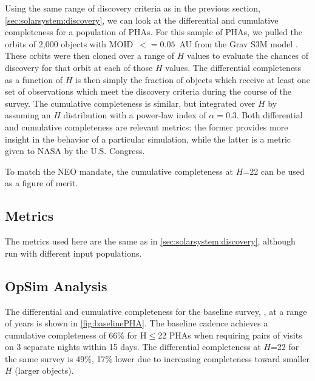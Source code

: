 Using the same range of discovery criteria as in the previous section,
\ref{sec:solarsystem:discovery}, we can look at the differential and
cumulative completeness for a population of PHAs. For this sample of
PHAs, we pulled the orbits of 2,000 objects with MOID~$<= 0.05$~AU from 
the Grav S3M model \citep{2011PASP..123..423G}. These orbits were
then cloned over a range of $H$ values to evaluate the chances of
discovery for that orbit at each of those $H$ values. The differential
completeness as a function of $H$ is then simply the fraction of
objects which receive at least one set of observations which meet the
discovery criteria during the course of the survey. The cumulative
completeness is similar, but integrated over $H$ by assuming an $H$
distribution with a power-law index of $\alpha=0.3$. Both
differential and cumulative completeness are relevant metrics: the
former provides more insight in the behavior of a particular
simulation, while the latter is a metric given to NASA by the U.S.
Congress.

To match the NEO mandate, the cumulative completeness at $H$=22 can be
used as a figure of merit.


\subsection{Metrics}
\label{sec:\secname:metrics}

The metrics used here are the same as in
\ref{sec:solarsystem:discovery}, although run with different input populations.


\subsection{OpSim Analysis}
\label{sec:\secname:analysis}

The differential and cumulative completeness for the baseline survey,
, at a range of years is shown in
\autoref{fig:baselinePHA}. The baseline cadence achieves a cumulative completeness of 66\% for
H$\le$22 PHAs when requiring pairs of visits on 3 separate nights within 15 days. 
The differential completeness at $H$=22 for the same
survey is 49\%, 17\% lower due to increasing completeness toward
smaller $H$ (larger objects).

